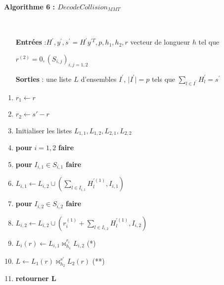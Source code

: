\documentclass[12pt,openany]{report}
\begin{document}
\begin{flushleft}
\begin{boxedminipage}[ poslb ]{15cm}

\paragraph{Algorithme 6 : $DecodeCollision_{MMT}$ }\cite{Ghazal} \\

\begin{itemize}
\item[\textbf{Entrées}]:$ \mathit{H}^{'},y^{'},s^{'}=H^{'}y^{'T},p,h_1,h_2,r $ vecteur de longueur $h$ tel que 
\item[] $ r^{(2)}=0,(S_{i,j})_{i,j=1,2}  $ 
\item[\textbf{Sorties}]: une liste $L$ d'ensembles $ \mathit{I}^{'} $, $ \mid  \mathit{I}^{'} \mid =p $ tels que $ \sum_{ l \in I^{'}} \mathit{H}^{'}_{l}=s^{'}  $
\end{itemize}
\begin{enumerate}
\item $ r_1 \gets r  $
\item $ r_2 \gets s'-r  $
\item Initialiser les listes $  L_{1,1},L_{1,2},L_{2,1},L_{2,2}  $
\item \textbf{pour} $i=1,2$ \textbf{faire}
\item \hspace{0.4cm} \textbf{pour} $ I_{i,1} \in S_{i,1}  $ \textbf{faire}
\item \hspace{0.8cm} $ L_{i,1} \gets L_{i,2} \cup (\sum_{l \in I_{i,1}} \mathit{H}_{l}^{'(1)},I_{i,1}) $
\item \hspace{0.4cm} \textbf{pour} $ I_{i,2} \in S_{i,2} $ \textbf{faire}
\item \hspace{0.8cm} $ L_{i,2} \gets L_{i,2} \cup (r_{i}^{(1)}+ \sum_{l \in I_{i,2}} \mathit{H}_{l}^{'(1)},I_{i,2}) $
\item \hspace{0.4cm} $ L_{i}(r) \gets L_{i,1} \Join_{h_1}^{r_i} L_{i,2} $ (*)
\item $ L \gets L_{1}(r)\Join_{h_2}^{s'}L_{2}(r)  $ (**)

\item \textbf{retourner L}

\end{enumerate}

   
\end{boxedminipage}
\end{flushleft}
\end{document}
